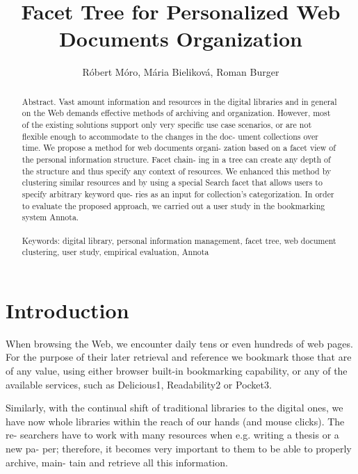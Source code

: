 \documentclass{llncs}
\begin{document}
\title{Facet Tree for Personalized Web Documents Organization}
\author{R\'obert M\'oro, M\'aria Bielikov\'a, Roman Burger}
 \maketitle
	
\begin{abstract}
Abstract. Vast amount information and resources in the digital libraries and in general on the Web demands effective methods of archiving and organization. However, most of the existing solutions support only very specific use case scenarios, or are not flexible enough to accommodate to the changes in the doc- ument collections over time. We propose a method for web documents organi- zation based on a facet view of the personal information structure. Facet chain- ing in a tree can create any depth of the structure and thus specify any context of resources. We enhanced this method by clustering similar resources and by using a special Search facet that allows users to specify arbitrary keyword que- ries as an input for collection’s categorization. In order to evaluate the proposed approach, we carried out a user study in the bookmarking system Annota.\\
\\
Keywords: digital library, personal information management, facet tree, web document clustering, user study, empirical evaluation, Annota

\end{abstract}


\section{Introduction}
When browsing the Web, we encounter daily tens or even hundreds of web pages. For the purpose of their later retrieval and reference we bookmark those that are of any value, using either browser built-in bookmarking capability, or any of the available services, such as Delicious1, Readability2 or Pocket3.

Similarly, with the continual shift of traditional libraries to the digital ones, we have now whole libraries within the reach of our hands (and mouse clicks). The re- searchers have to work with many resources when e.g. writing a thesis or a new pa- per; therefore, it becomes very important to them to be able to properly archive, main- tain and retrieve all this information.
\end{document}
